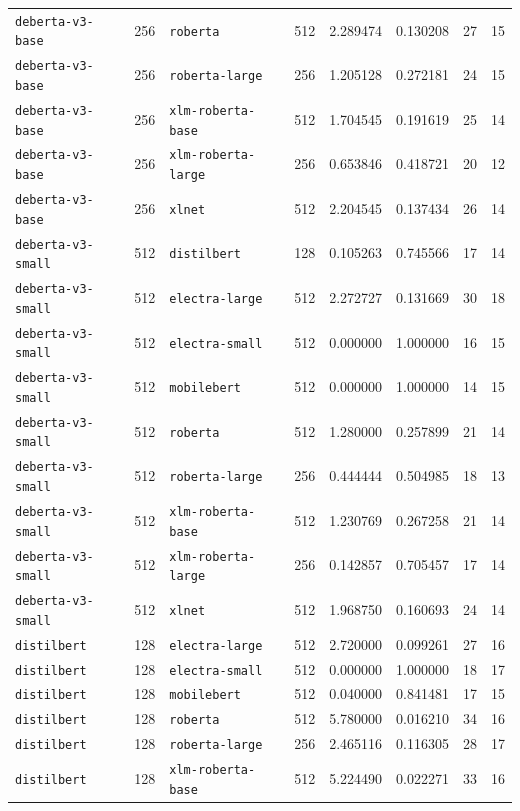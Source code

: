 \documentclass[11pt]{article}
\begin{document}
\begin{landscape}
\begin{longtable}{llllcccc}
\texttt{deberta-v3-base} & 256 & \texttt{roberta} & 512 & 2.289474 & 0.130208 & 27 & 15 \\
\texttt{deberta-v3-base} & 256 & \texttt{roberta-large} & 256 & 1.205128 & 0.272181 & 24 & 15 \\
\texttt{deberta-v3-base} & 256 & \texttt{xlm-roberta-base} & 512 & 1.704545 & 0.191619 & 25 & 14 \\
\texttt{deberta-v3-base} & 256 & \texttt{xlm-roberta-large} & 256 & 0.653846 & 0.418721 & 20 & 12 \\
\texttt{deberta-v3-base} & 256 & \texttt{xlnet} & 512 & 2.204545 & 0.137434 & 26 & 14 \\
\texttt{deberta-v3-small} & 512 & \texttt{distilbert} & 128 & 0.105263 & 0.745566 & 17 & 14 \\
\texttt{deberta-v3-small} & 512 & \texttt{electra-large} & 512 & 2.272727 & 0.131669 & 30 & 18 \\
\texttt{deberta-v3-small} & 512 & \texttt{electra-small} & 512 & 0.000000 & 1.000000 & 16 & 15 \\
\texttt{deberta-v3-small} & 512 & \texttt{mobilebert} & 512 & 0.000000 & 1.000000 & 14 & 15 \\
\texttt{deberta-v3-small} & 512 & \texttt{roberta} & 512 & 1.280000 & 0.257899 & 21 & 14 \\
\texttt{deberta-v3-small} & 512 & \texttt{roberta-large} & 256 & 0.444444 & 0.504985 & 18 & 13 \\
\texttt{deberta-v3-small} & 512 & \texttt{xlm-roberta-base} & 512 & 1.230769 & 0.267258 & 21 & 14 \\
\texttt{deberta-v3-small} & 512 & \texttt{xlm-roberta-large} & 256 & 0.142857 & 0.705457 & 17 & 14 \\
\texttt{deberta-v3-small} & 512 & \texttt{xlnet} & 512 & 1.968750 & 0.160693 & 24 & 14 \\
\texttt{distilbert} & 128 & \texttt{electra-large} & 512 & 2.720000 & 0.099261 & 27 & 16 \\
\texttt{distilbert} & 128 & \texttt{electra-small} & 512 & 0.000000 & 1.000000 & 18 & 17 \\
\texttt{distilbert} & 128 & \texttt{mobilebert} & 512 & 0.040000 & 0.841481 & 17 & 15 \\
\texttt{distilbert} & 128 & \texttt{roberta} & 512 & 5.780000 & 0.016210 & 34 & 16 \\
\texttt{distilbert} & 128 & \texttt{roberta-large} & 256 & 2.465116 & 0.116305 & 28 & 17 \\
\texttt{distilbert} & 128 & \texttt{xlm-roberta-base} & 512 & 5.224490 & 0.022271 & 33 & 16 \\

\end{longtable}
\end{landscape}
\end{document}
